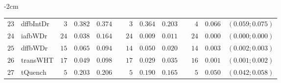 \begin{table*}[!htbp]
\begin{adjustwidth*}{}{-2cm}
\begin{tabular}{@{}rlrrrrrrrrrcc@{}}
\footnotesize{$23$} & \footnotesize{dffbIntDr} & \footnotesize{$3 $} & \footnotesize{$0.382$} & \footnotesize{$0.374$} && \footnotesize{$3 $} & \footnotesize{$0.364$} & \footnotesize{$0.203$} && \footnotesize{$4 $} & \footnotesize{$0.066$} & \footnotesize{$(0.059;0.075)$} \\
\footnotesize{$24$} & \footnotesize{iafbWDr  } & \footnotesize{$24$} & \footnotesize{$0.038$} & \footnotesize{$0.164$} && \footnotesize{$24$} & \footnotesize{$0.009$} & \footnotesize{$0.011$} && \footnotesize{$24$} & \footnotesize{$0.000$} & \footnotesize{$(0.000;0.000)$} \\
\footnotesize{$25$} & \footnotesize{dffbWDr  } & \footnotesize{$15$} & \footnotesize{$0.065$} & \footnotesize{$0.094$} && \footnotesize{$14$} & \footnotesize{$0.050$} & \footnotesize{$0.020$} && \footnotesize{$14$} & \footnotesize{$0.003$} & \footnotesize{$(0.002;0.003)$} \\
\footnotesize{$26$} & \footnotesize{transWHT } & \footnotesize{$17$} & \footnotesize{$0.049$} & \footnotesize{$0.098$} && \footnotesize{$17$} & \footnotesize{$0.029$} & \footnotesize{$0.035$} && \footnotesize{$16$} & \footnotesize{$0.001$} & \footnotesize{$(0.001;0.002)$} \\
\footnotesize{$27$} & \footnotesize{tQuench  } & \footnotesize{$5 $} & \footnotesize{$0.203$} & \footnotesize{$0.206$} && \footnotesize{$5 $} & \footnotesize{$0.190$} & \footnotesize{$0.165$} && \footnotesize{$5 $} & \footnotesize{$0.050$} & \footnotesize{$(0.042;0.058)$} \\
\bottomrule
\end{tabular}
\end{adjustwidth*}
\end{table*}

